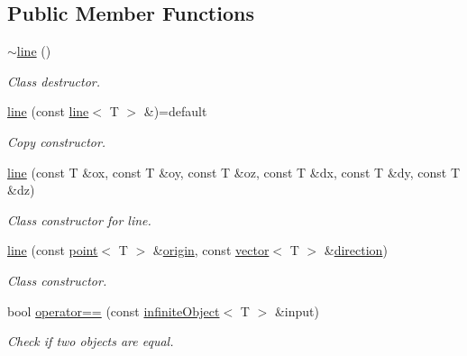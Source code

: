 \subsection*{Public Member Functions}
\begin{DoxyCompactItemize}
\item 
\mbox{\label{classddd_1_1line_a456f8a87d73fbc2aaf27c502bec653e3}} 
\hyperlink{classddd_1_1line_a456f8a87d73fbc2aaf27c502bec653e3}{$\sim$line} ()
\begin{DoxyCompactList}\small\item\em Class destructor. \end{DoxyCompactList}\item 
\mbox{\label{classddd_1_1line_a0a87f672568157869bbf2aa6c4f78395}} 
\hyperlink{classddd_1_1line_a0a87f672568157869bbf2aa6c4f78395}{line} (const \hyperlink{classddd_1_1line}{line}$<$ T $>$ \&)=default
\begin{DoxyCompactList}\small\item\em Copy constructor. \end{DoxyCompactList}\item 
\mbox{\label{classddd_1_1line_ae98a2882b4367e03d6d812f2b5fb31bd}} 
\hyperlink{classddd_1_1line_ae98a2882b4367e03d6d812f2b5fb31bd}{line} (const T \&ox, const T \&oy, const T \&oz, const T \&dx, const T \&dy, const T \&dz)
\begin{DoxyCompactList}\small\item\em Class constructor for line. \end{DoxyCompactList}\item 
\hyperlink{classddd_1_1line_a8499fa13ffea06de1705c05f742e0f5c}{line} (const \hyperlink{classddd_1_1point}{point}$<$ T $>$ \&\hyperlink{classddd_1_1infinite_object_a0097f1df7ea358d410a73bdfcf2904f9}{origin}, const \hyperlink{classddd_1_1vector}{vector}$<$ T $>$ \&\hyperlink{classddd_1_1infinite_object_a7197d400db3804be122c78475c242a00}{direction})
\begin{DoxyCompactList}\small\item\em Class constructor. \end{DoxyCompactList}\item 
bool \hyperlink{classddd_1_1infinite_object_a7cd3342d60d4de4e4fc91d90fa9cc065}{operator==} (const \hyperlink{classddd_1_1infinite_object}{infinite\+Object}$<$ T $>$ \&input)
\begin{DoxyCompactList}\small\item\em Check if two objects are equal. \end{DoxyCompactList}\item 

\end{DoxyCompactItemize}
